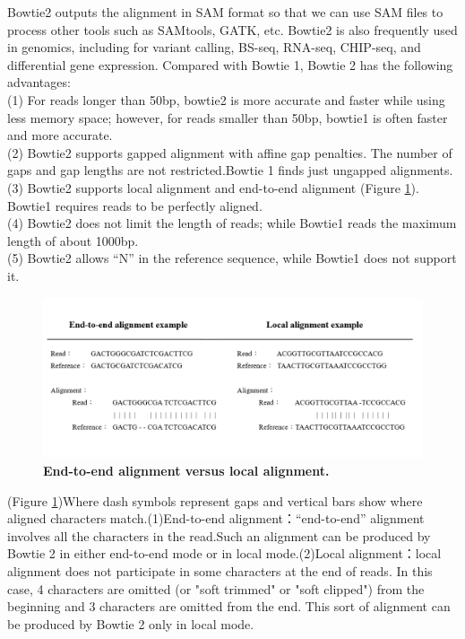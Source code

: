 \documentclass{PHlab-thesis}
\begin{document}
\par
Bowtie2 outputs the alignment in SAM format so that we can use SAM files to process other tools such as SAMtools, GATK, etc. Bowtie2 is also frequently used in genomics, including for variant calling, BS-seq, RNA-seq, CHIP-seq, and differential gene expression. Compared with Bowtie 1, Bowtie 2 has the following advantages:\\
(1) For reads longer than 50bp, bowtie2 is more accurate and faster while using less memory space; however, for reads smaller than 50bp, bowtie1 is often faster and more accurate.\\
(2) Bowtie2 supports gapped alignment with affine gap penalties. The number of gaps and gap lengths are not restricted.Bowtie 1 finds just ungapped alignments.\\
(3) Bowtie2 supports local alignment and end-to-end alignment (Figure \ref{f5}). Bowtie1 requires reads to be perfectly aligned.\\
(4) Bowtie2 does not limit the length of reads; while Bowtie1 reads the maximum length of about 1000bp.\\
(5) Bowtie2 allows “N” in the reference sequence, while Bowtie1 does not support it.\\

\begin{figure}[h]
  \centering
  \includegraphics[scale=0.8]{figures/bowtie2_align.png}
  \caption{\textbf{End-to-end alignment versus local alignment.}
  }
  \label{f5}
\end{figure}

\par
(Figure \ref{f5})Where dash symbols represent gaps and vertical bars show where aligned characters match.(1)End-to-end alignment：“end-to-end” alignment involves all the characters in the read.Such an alignment can be produced by Bowtie 2 in either end-to-end mode or in local mode.(2)Local alignment：local alignment does not participate in some characters at the end of reads. In this case, 4 characters are omitted (or "soft trimmed" or "soft clipped") from the beginning and 3 characters are omitted from the end. This sort of alignment can be produced by Bowtie 2 only in local mode.
\end{document}

